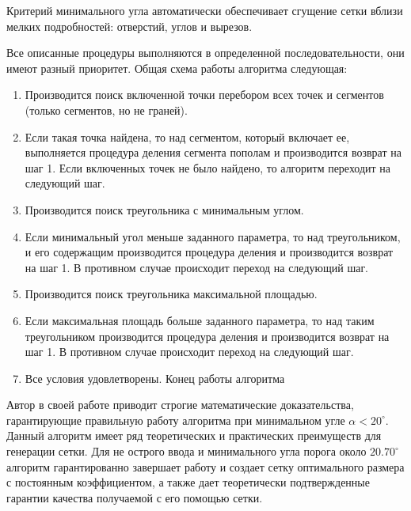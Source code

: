 \documentclass[14pt]{extreport}
\begin{document}
Критерий минимального угла автоматически обеспечивает сгущение сетки вблизи мелких подробностей: отверстий, углов и вырезов. 

Все описанные процедуры выполняются в определенной последовательности, они имеют разный приоритет. Общая схема работы алгоритма следующая:

\begin{enumerate}

\item Производится поиск включенной точки перебором всех точек и сегментов (только сегментов, но не граней).

\item Если такая точка найдена, то над сегментом, который включает ее, выполняется процедура деления сегмента пополам и производится возврат на шаг 1. Если включенных точек не было найдено, то алгоритм переходит на следующий шаг.

\item Производится поиск треугольника с минимальным углом.

\item Если минимальный угол меньше заданного параметра, то над треугольником, и его содержащим производится процедура деления и производится возврат на шаг 1. В противном случае происходит переход на следующий шаг.

\item Производится поиск треугольника максимальной площадью.

\item Если максимальная площадь больше заданного параметра, то над таким треугольником производится процедура деления и производится возврат на шаг 1. В противном случае происходит переход на следующий шаг.

\item Все условия удовлетворены. Конец работы алгоритма

\end{enumerate}


Автор в своей работе \cite{bib:triangle:ruppert} приводит строгие математические доказательства, гарантирующие правильную работу алгоритма при минимальном угле $\alpha < 20^{\circ}$. Данный алгоритм имеет ряд теоретических и практических преимуществ для генерации сетки.  Для не острого ввода и минимального угла порога около $20.70^{\circ}$ алгоритм гарантированно завершает работу и создает сетку оптимального размера с постоянным коэффициентом, а также  дает теоретически подтвержденные гарантии качества получаемой с его помощью сетки.
\end{document}
